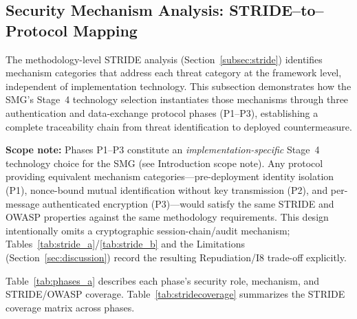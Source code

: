 \documentclass[preprint,12pt,authoryear]{elsarticle}
\begin{document}
\subsection{Security Mechanism Analysis: STRIDE--to--Protocol Mapping}
\label{subsec:strideprot}

The methodology-level STRIDE analysis (Section~\ref{subsec:stride}) identifies mechanism categories that address each threat category at the framework level, independent of implementation technology. This subsection demonstrates how the SMG's Stage~4 technology selection instantiates those mechanisms through three authentication and data-exchange protocol phases (P1--P3), establishing a complete traceability chain from threat identification to deployed countermeasure.

\textbf{Scope note:} Phases P1--P3 constitute an \emph{implementation-specific} Stage~4 technology choice for the SMG (see Introduction scope note). Any protocol providing equivalent mechanism categories---pre-deployment identity isolation (P1), nonce-bound mutual identification without key transmission (P2), and per-message authenticated encryption (P3)---would satisfy the same STRIDE and OWASP properties against the same methodology requirements. This design intentionally omits a cryptographic session-chain/audit mechanism; Tables~\ref{tab:stride_a}/\ref{tab:stride_b} and the Limitations (Section~\ref{sec:discussion}) record the resulting Repudiation/I8 trade-off explicitly.

Table~\ref{tab:phases_a} describes each phase's security role, mechanism, and STRIDE/OWASP coverage. Table~\ref{tab:stridecoverage} summarizes the STRIDE coverage matrix across phases.
\end{document}

